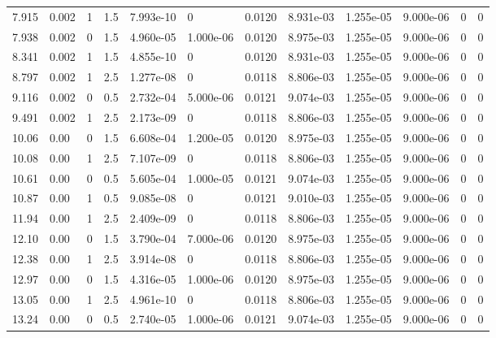 \documentclass[preview]{standalone}
\begin{document}
{{\begin{tabular}{L{1.2cm}C{1.2cm} C{0.3cm}C{0.5cm} C{1.4cm}C{1.4cm} C{1.4cm}C{1.4cm} C{1.6cm}C{1.6cm} C{1.6cm}C{1.6cm}}
  7.915  &  0.002  & 1     & 1.5 &  7.993e-10  & 0  &  0.0120&   8.931e-03& 1.255e-05 & 9.000e-06   &  0 & 0  \\ 
  7.938  &  0.002  & 0     & 1.5 &  4.960e-05  & 1.000e-06  &  0.0120&   8.975e-03& 1.255e-05 & 9.000e-06   &  0 & 0  \\ 
  8.341  &  0.002  & 1     & 1.5 &  4.855e-10  & 0  &  0.0120&   8.931e-03& 1.255e-05 & 9.000e-06   &  0 & 0  \\ 
  8.797  &  0.002  & 1     & 2.5 &  1.277e-08  & 0  &  0.0118&   8.806e-03& 1.255e-05 & 9.000e-06   &  0 & 0  \\ 
  9.116  &  0.002  & 0     & 0.5 &  2.732e-04  & 5.000e-06  &  0.0121&   9.074e-03& 1.255e-05 & 9.000e-06   &  0 & 0  \\ 
  9.491  &  0.002  & 1     & 2.5 &  2.173e-09  & 0  &  0.0118&   8.806e-03& 1.255e-05 & 9.000e-06   &  0 & 0  \\ 
  10.06  &  0.00  & 0     & 1.5 &  6.608e-04  & 1.200e-05  &  0.0120&   8.975e-03& 1.255e-05 & 9.000e-06   &  0 & 0  \\ 
  10.08  &  0.00  & 1     & 2.5 &  7.107e-09  & 0  &  0.0118&   8.806e-03& 1.255e-05 & 9.000e-06   &  0 & 0  \\ 
  10.61  &  0.00  & 0     & 0.5 &  5.605e-04  & 1.000e-05  &  0.0121&   9.074e-03& 1.255e-05 & 9.000e-06   &  0 & 0  \\ 
  10.87  &  0.00  & 1     & 0.5 &  9.085e-08  & 0  &  0.0121&   9.010e-03& 1.255e-05 & 9.000e-06   &  0 & 0  \\ 
  11.94  &  0.00  & 1     & 2.5 &  2.409e-09  & 0  &  0.0118&   8.806e-03& 1.255e-05 & 9.000e-06   &  0 & 0  \\ 
  12.10  &  0.00  & 0     & 1.5 &  3.790e-04  & 7.000e-06  &  0.0120&   8.975e-03& 1.255e-05 & 9.000e-06   &  0 & 0  \\ 
  12.38  &  0.00  & 1     & 2.5 &  3.914e-08  & 0  &  0.0118&   8.806e-03& 1.255e-05 & 9.000e-06   &  0 & 0  \\ 
  12.97  &  0.00  & 0     & 1.5 &  4.316e-05  & 1.000e-06  &  0.0120&   8.975e-03& 1.255e-05 & 9.000e-06   &  0 & 0  \\ 
  13.05  &  0.00  & 1     & 2.5 &  4.961e-10  & 0  &  0.0118&   8.806e-03& 1.255e-05 & 9.000e-06   &  0 & 0  \\ 
  13.24  &  0.00  & 0     & 0.5 &  2.740e-05  & 1.000e-06  &  0.0121&   9.074e-03& 1.255e-05 & 9.000e-06   &  0 & 0  \\ 
\hline 
\end{tabular} 

}}
\end{document}
